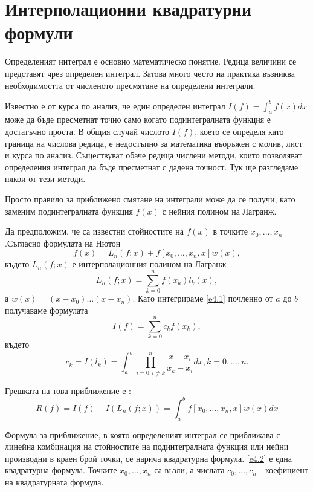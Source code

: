 \documentclass[12pt]{article}
\numberwithin{equation}{section}
\numberwithin{theorem}{section}
\numberwithin{definition}{section}
\numberwithin{corollary}{section}
\begin{document}
\section{Интерполационни квадратурни формули}
Определеният интеграл е основно математическо понятие. Редица величини се представят чрез определен интеграл. Затова много често на практика възниква необходимостта от численото пресмятане на определени интеграли.
\par
Известно е от курса по анализ, че един определен интеграл $I(f)=\int_a^bf(x)dx$ може да бъде пресметнат точно само когато подинтегралната функция е достатъчно проста. В общия случай числото $I(f)$, което се определя като граница на числова редица, е недостъпно за математика въоръжен с молив, лист и курса по анализ. Съществуват обаче редица числени методи, които позволяват определения интеграл да бъде пресметнат с дадена точност. Тук ще разгледаме някои от тези методи.
\par
Просто правило за приближено смятане на интеграли може да се получи, като заменим подинтегралната функция $f(x)$ с нейния полином на Лагранж.
\par
Да предположим, че са известни стойностите на $f(x)$ в точките $x_0,\dotso,x_n$.Съгласно формулата на Нютон
\begin{equation}\label{e4.1}
f(x) = L_n(f;x)+f[x_0,\dotso,x_n,x]w(x),
\end{equation}
където $L_n(f;x)$ е интерполационния полином на Лагранж
\[
L_n(f;x) = \displaystyle\sum_{k=0}^nf(x_k)l_k(x),
\]
а $w(x) = (x-x_0)\dotso(x-x_n)$. Като интегрираме \ref{e4.1} почленно от $a$ до $b$ получаваме формулата
\begin{equation}\label{e4.2}
I(f) = \displaystyle\sum_{k=0}^nc_kf(x_k),
\end{equation}
където
\begin{equation}\label{e4.3}
c_k = I(l_k)=\int_a^b\displaystyle\prod_{i=0,i\neq k}^n\frac{x-x_i}{x_k-x_i}dx, k=0,\dotso,n.
\end{equation}
\par
Грешката на това приближение е :
\begin{equation}\label{e4.4}
R(f) = I(f)-I(L_n(f;x)) = \int_a^bf[x_0,\dotso,x_n,x]w(x)dx
\end{equation}
\par
Формула за приближение, в която определеният интеграл се приближава с линейна комбинация на стойностите на подинтегралната функция или нейни производни в краен брой точки, се нарича квадратурна формула. \ref{e4.2} е една квадратурна формула. Точките $x_0,\dotso, x_n$ са възли, а числата $c_0,\dotso,c_n$ - коефициент на квадратурната формула.
\end{document}
